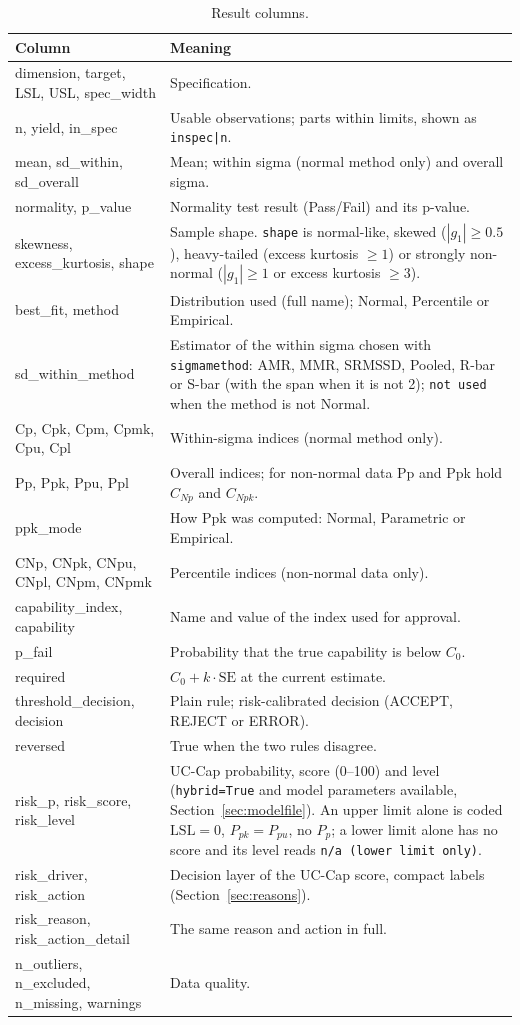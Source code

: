\documentclass[a4paper,11pt,oneside,openany,parskip=half-,headings=standardclasses,toc=flat,numbers=noenddot]{scrbook}
\newcommand{\thead}[1]{{\sffamily\bfseries\footnotesize #1}}
\newcommand{\code}[1]{\texttt{\begingroup\def\_{\textunderscore\allowbreak}#1\endgroup}}
\newcommand{\secref}[1]{Section~\ref{#1}}
\begin{document}
\begin{table}[!htp]
\caption{Result columns.}\label{tab:columns}
\small
\begin{tabularx}{\textwidth}{@{}P{52mm}L@{}}
\toprule
\thead{Column} & \thead{Meaning}\\
\midrule
dimension, target, LSL, USL, spec\_width & Specification.\\
n, yield, in\_spec & Usable observations; parts within limits, shown as \code{in\_spec|n}.\\
mean, sd\_within, sd\_overall & Mean; within sigma (normal method only) and overall sigma.\\
normality, p\_value & Normality test result (Pass/Fail) and its p-value.\\
skewness, excess\_kurtosis, shape & Sample shape. \code{shape} is normal-like, skewed ($|g_1| \ge 0.5$), heavy-tailed (excess kurtosis $\ge 1$) or strongly non-normal ($|g_1| \ge 1$ or excess kurtosis $\ge 3$).\\
best\_fit, method & Distribution used (full name); Normal, Percentile or Empirical.\\
sd\_within\_method & Estimator of the within sigma chosen with \code{sigma\_method}: AMR, MMR, SRMSSD, Pooled, R-bar or S-bar (with the span when it is not 2); \code{not used} when the method is not Normal.\\
Cp, Cpk, Cpm, Cpmk, Cpu, Cpl & Within-sigma indices (normal method only).\\
Pp, Ppk, Ppu, Ppl & Overall indices; for non-normal data Pp and Ppk hold $C_{Np}$ and $C_{Npk}$.\\
ppk\_mode & How Ppk was computed: Normal, Parametric or Empirical.\\
CNp, CNpk, CNpu, CNpl, CNpm, CNpmk & Percentile indices (non-normal data only).\\
capability\_index, capability & Name and value of the index used for approval.\\
p\_fail & Probability that the true capability is below $C_0$.\\
required & $C_0 + k\cdot\mathrm{SE}$ at the current estimate.\\
threshold\_decision, decision & Plain rule; risk-calibrated decision (ACCEPT, REJECT or ERROR).\\
reversed & True when the two rules disagree.\\
risk\_p, risk\_score, risk\_level & UC-Cap probability, score (0--100) and level (\code{hybrid=True} and model parameters available, \secref{sec:modelfile}). An upper limit alone is coded $\mathrm{LSL} = 0$, $P_{pk} = P_{pu}$, no $P_p$; a lower limit alone has no score and its level reads \code{n/a (lower limit only)}.\\
risk\_driver, risk\_action & Decision layer of the UC-Cap score, compact labels (\secref{sec:reasons}).\\
risk\_reason, risk\_action\_detail & The same reason and action in full.\\
n\_outliers, n\_excluded, n\_missing, warnings & Data quality.\\
\bottomrule
\end{tabularx}
\end{table}
\end{document}
